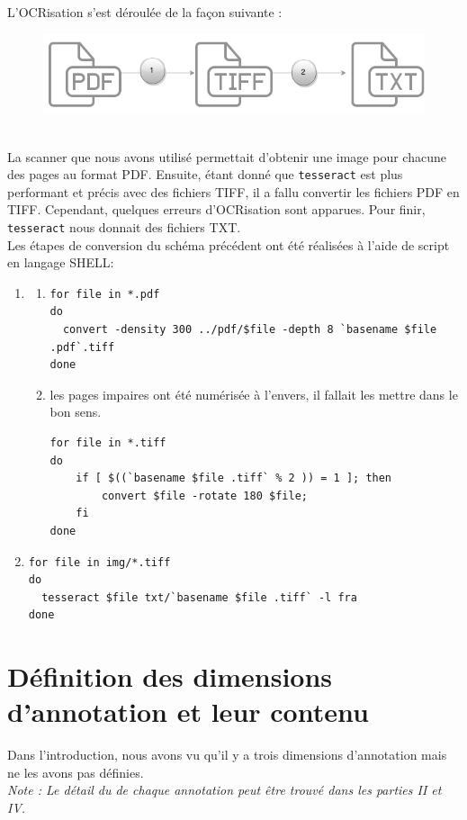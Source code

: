 \documentclass[a4paper, 11pt]{report}
\begin{document}
    L'OCRisation s'est déroulée de la façon suivante : 
    \begin{figure}[h]
    \centering
    \includegraphics[scale=.3]{img/OCRisation.png}
    \end{figure}\\
    La scanner que nous avons utilisé permettait d'obtenir une image pour chacune des pages au format PDF. Ensuite, étant donné que  \texttt{tesseract} est plus performant et précis avec des fichiers TIFF, il a fallu convertir les fichiers PDF en TIFF. Cependant, quelques erreurs d'OCRisation sont apparues. Pour finir,  \texttt{tesseract} nous donnait des fichiers TXT.\\
    Les étapes de conversion du schéma précédent ont été réalisées à l'aide de script en langage SHELL:
    \begin{enumerate}
        \item \begin{enumerate}
    	      \item	
           \begin{verbatim}
for file in *.pdf
do
  convert -density 300 ../pdf/$file -depth 8 `basename $file .pdf`.tiff
done
           \end{verbatim}
          \item les pages impaires ont été numérisée à l'envers, il fallait les mettre dans le bon sens.
          \begin{verbatim}
for file in *.tiff
do
    if [ $((`basename $file .tiff` % 2 )) = 1 ]; then
        convert $file -rotate 180 $file;
    fi
done
          \end{verbatim}
       \end{enumerate}
    \item 
    \begin{verbatim}
for file in img/*.tiff
do
  tesseract $file txt/`basename $file .tiff` -l fra
done 
    \end{verbatim}
    \end{enumerate}
    
	\section{Définition des dimensions d'annotation et leur contenu}
    Dans l'introduction, nous avons vu qu'il y a trois dimensions d'annotation mais ne les avons pas définies.\\
	\textit{Note : Le détail du de chaque annotation peut être trouvé dans les parties II et IV.}
\end{document}
